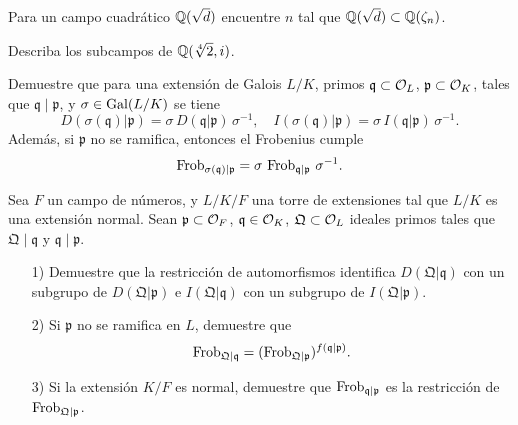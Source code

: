 \begin{ejercicio}
  Para un campo cuadrático $\mathbb{Q} (\sqrt{d})$ encuentre $n$ tal que
  $\mathbb{Q} (\sqrt{d}) \subset \mathbb{Q} (\zeta_n)$.
\end{ejercicio}

\begin{ejercicio}
  Describa los subcampos de $\mathbb{Q} (\sqrt[4]{2},i)$.
\end{ejercicio}

\begin{ejercicio}
  Demuestre que para una extensión de Galois $L/K$, primos
  $\mathfrak{q} \subset \mathcal{O}_L$, $\mathfrak{p} \subset \mathcal{O}_K$,
  tales que
  $\mathfrak{q} \mid \mathfrak{p}$, y $\sigma \in \operatorname{Gal} (L/K)$ se tiene
  \[ D (\sigma (\mathfrak{q})|\mathfrak{p}) =
  \sigma \, D (\mathfrak{q}|\mathfrak{p}) \, \sigma^{-1}, \quad
  I (\sigma (\mathfrak{q})|\mathfrak{p}) =
  \sigma \, I (\mathfrak{q}|\mathfrak{p}) \, \sigma^{-1}. \]
  Además, si $\mathfrak{p}$ no se ramifica, entonces el Frobenius cumple
  \[ \operatorname{Frob}_{\sigma (\mathfrak{q})|\mathfrak{p}} =
  \sigma \, \operatorname{Frob}_{\mathfrak{q}|\mathfrak{p}} \, \sigma^{-1}. \]
\end{ejercicio}

\begin{ejercicio}
  Sea $F$ un campo de números, y $L/K/F$ una torre de extensiones tal que $L/K$
  es una extensión normal. Sean $\mathfrak{p} \subset \mathcal{O}_F$,
  $\mathfrak{q} \in \mathcal{O}_K$, $\mathfrak{Q} \subset \mathcal{O}_L$ ideales primos tales que
  $\mathfrak{Q} \mid \mathfrak{q}$ y $\mathfrak{q}\mid\mathfrak{p}$.

  \begin{enumerate}
  \item[1)] Demuestre que la restricción de automorfismos identifica
    $D (\mathfrak{Q}|\mathfrak{q})$ con un subgrupo de
    $D (\mathfrak{Q}|\mathfrak{p})$ e
    $I (\mathfrak{Q}|\mathfrak{q})$ con un subgrupo de
    $I (\mathfrak{Q}|\mathfrak{p})$.

  \item[2)] Si $\mathfrak{p}$ no se ramifica en $L$, demuestre que
    $$\operatorname{Frob}_{\mathfrak{Q}|\mathfrak{q}} = (\operatorname{Frob}_{\mathfrak{Q}|\mathfrak{p}})^{f (\mathfrak{q}|\mathfrak{p})}.$$

  \item[3)] Si la extensión $K/F$ es normal, demuestre que
    $\operatorname{Frob}_{\mathfrak{q}|\mathfrak{p}}$ es la restricción de
    $\operatorname{Frob}_{\mathfrak{Q}|\mathfrak{p}}$.
  \end{enumerate}
\end{ejercicio}

